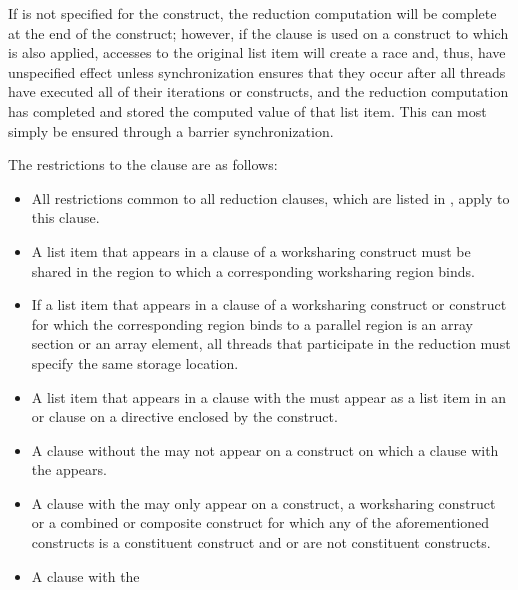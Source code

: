 If  is not specified for the construct, the reduction computation 
will be complete at the end of the construct; however, if the  
clause is used on a construct to which  is also applied, accesses 
to the original list item will create a race and, thus, have unspecified effect 
unless synchronization ensures that they occur after all threads have executed 
all of their iterations or  constructs, and the reduction computation
has completed and stored the computed value of that list item. This can most 
simply be ensured through a barrier synchronization.

\restrictions
The restrictions to the  clause are as follows:

\begin{itemize}
\item All restrictions common to all reduction clauses, which are listed in
      , apply to
      this clause.
\item A list item that appears in a  clause of a worksharing
      construct must be shared in the  region to which a corresponding
      worksharing region binds.
\item If a list item that appears in a  clause of a worksharing
      construct or  construct for which the corresponding region binds to a
      parallel region is an array section or an array element, all threads
      that participate in the reduction must specify the same storage location.
\item A list item that appears in a  clause with the  
       must appear as a list item in an  or
       clause on a  directive enclosed by the construct.
\item A  clause without the   
      may not appear on a construct on which a  clause with the
        appears.
\item A  clause with the  
      may only appear on a  construct, a worksharing construct
      or a combined or composite construct for which any of the aforementioned 
      constructs is a constituent construct and  or  are 
      not constituent constructs.
\item A  clause with the  

\end{itemize}
